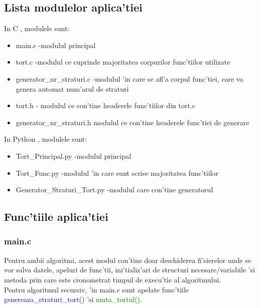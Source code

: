 \documentclass{article}
\begin{document}
\newpage

\subsection{Lista modulelor aplica'tiei}

{\large In C , modulele sunt:}

\begin{itemize}

    \item main.c                    -modulul principal
    \item tort.c                    -modulul ce cuprinde majoritatea corpurilor func'tiilor utilizate
    \item generator\_nr\_straturi.c -modulul 'in care se afl'a corpul func'tiei, care va genera automat num'arul de straturi 
    \item tort.h - modulul ce con'tine headerele func'tiilor din tort.c
    \item generator\_nr\_straturi.h modulul ce con'tine headerele func'tiei de generare
    
\end{itemize}
{\large In Python , modulele sunt:}

\begin{itemize}
    \item Tort\_Principal.py -modulul principal
    \item Tort\_Func.py -modulul 'in care sunt scrise majoritatea func'tiilor
    \item Generator\_Straturi\_Tort.py -modulul care con'tine generatorul

\end{itemize}

\subsection{Func'tiile aplica'tiei}
\subsubsection{main.c}
Pentru ambii algoritmi, acest modul con'tine doar deschiderea fi'sierelor unde se vor salva datele, apeluri de func'tii, ini'tializ'ari de structuri necesare/variabile 'si metoda prin care este cronometrat timpul de execu'tie al algoritmului.   \\

Pentru algoritmul recursiv, 'in main.c sunt apelate func'tiile \\
\textcolor{blue}{genereaza\_straturi\_tort()} 'si \textcolor{green}{muta\_tortul()}. \\ 
\end{document}
